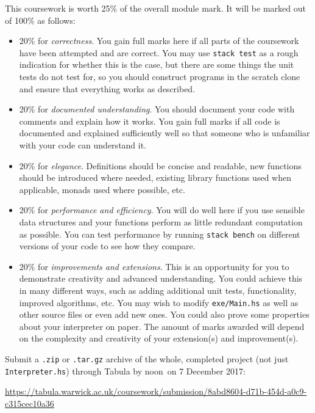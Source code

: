 \documentclass{cs256-shared/cs256}
\newcommand{\deadlineTime}{noon}
\newcommand{\deadlineDate}{7 December 2017}
\newcommand{\submissionURL}{https://tabula.warwick.ac.uk/coursework/submission/8abd8604-d71b-454d-a0c9-c315cec10a36}
\begin{document}
This coursework is worth 25\% of the overall module mark. It will be marked out of 100\% as follows:
\begin{itemize}
	\item 20\% for \emph{correctness}. You gain full marks here if all parts of the coursework have been attempted and are correct. You may use \texttt{stack test} as a rough indication for whether this is the case, but there are some things the unit tests do not test for, so you should construct programs in the scratch clone and ensure that everything works as described.
	\item 20\% for \emph{documented understanding}. You should document your code with comments and explain how it works. You gain full marks if all code is documented and explained sufficiently well so that someone who is unfamiliar with your code can understand it.
	\item 20\% for \emph{elegance}. Definitions should be concise and readable, new functions should be introduced where needed, existing library functions used when applicable, monads used where possible, etc. 
	\item 20\% for \emph{performance and efficiency}. You will do well here if you use sensible data structures and your functions perform as little redundant computation as possible. You can test performance by running \texttt{stack bench} on different versions of your code to see how they compare. 
	\item 20\% for \emph{improvements and extensions}. This is an opportunity for you to demonstrate creativity and advanced understanding. You could achieve this in many different ways, such as adding additional unit tests, functionality, improved algorithms, etc. You may wish to modify \texttt{exe/Main.hs} as well as other source files or even add new ones. You could also prove some properties about your interpreter on paper. The amount of marks awarded will depend on the complexity and creativity of your extension(s) and improvement(s).
\end{itemize}
Submit a \texttt{.zip} or \texttt{.tar.gz} archive of the whole, completed project (not just \texttt{Interpreter.hs}) through Tabula by \deadlineTime\ on \deadlineDate:

\begin{center} 
\url{\submissionURL}
\end{center}
\end{document}
